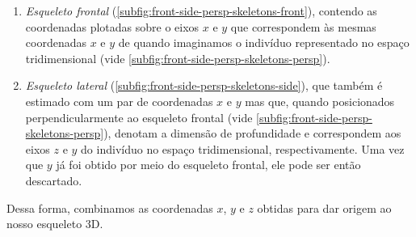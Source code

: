\begin{enumerate}
          \begin{enumerate}
              \item \textit{Esqueleto frontal} (\autoref{subfig:front-side-persp-skeletons-front}), contendo as coordenadas plotadas sobre o eixos \(x\) e \(y\) que correspondem às mesmas coordenadas \(x\) e \(y\) de quando imaginamos o indivíduo representado no espaço tridimensional (vide \autoref{subfig:front-side-persp-skeletons-persp}).

              \item \textit{Esqueleto lateral} (\autoref{subfig:front-side-persp-skeletons-side}), que também é estimado com um par de coordenadas \(x\) e \(y\) mas que, quando posicionados perpendicularmente ao esqueleto frontal (vide \autoref{subfig:front-side-persp-skeletons-persp}), denotam a dimensão de profundidade e correspondem aos eixos \(z\) e \(y\) do indivíduo no espaço tridimensional, respectivamente. Uma vez que \(y\) já foi obtido por meio do esqueleto frontal, ele pode ser então descartado.

          \end{enumerate}

          Dessa forma, combinamos as coordenadas \(x\), \(y\) e \(z\) obtidas para dar origem ao nosso esqueleto 3D.


\end{enumerate}
